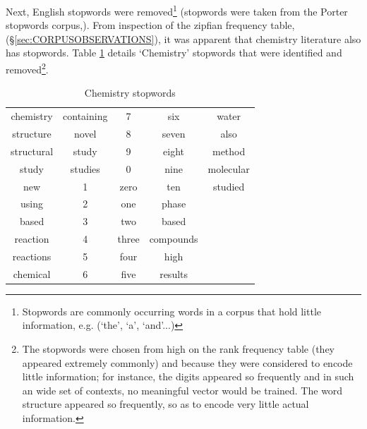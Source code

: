 Next, English stopwords were removed\footnote{Stopwords are commonly occurring words in a corpus that hold little information, e.g. (`the', `a', `and'...)} (stopwords were taken from the Porter stopwords corpus\cite{nltk},\cite{porter}). From inspection of the zipfian frequency table, (\S \ref{sec:CORPUSOBSERVATIONS}), it was apparent that chemistry literature also has stopwords. Table \ref{tab:CHEMSTOP} details `Chemistry' stopwords that were identified and removed\footnote{The stopwords were chosen from high on the rank frequency table (they appeared extremely commonly) and because they were considered to encode little information; for instance, the digits appeared so frequently and in such an wide set of contexts, no meaningful vector would be trained. The word structure appeared so frequently, so as to encode very little actual information.}. 
\begin{table}[H]
\begin{center}
\caption{Chemistry stopwords}
\label{tab:CHEMSTOP}
\begin{tabular}{||c|c|c|c|c||}
\hline
chemistry & containing & 7 & six & water\\
structure & novel & 8 & seven & also\\
structural & study & 9 & eight & method\\
study & studies & 0 & nine & molecular\\
new & 1 & zero & ten & studied\\
using & 2 & one & phase& \\
based & 3 & two & based& \\
reaction & 4 & three & compounds & \\
reactions & 5 & four & high & \\
chemical & 6 & five & results & \\
\hline

\end{tabular}
\end{center}
\end{table}

